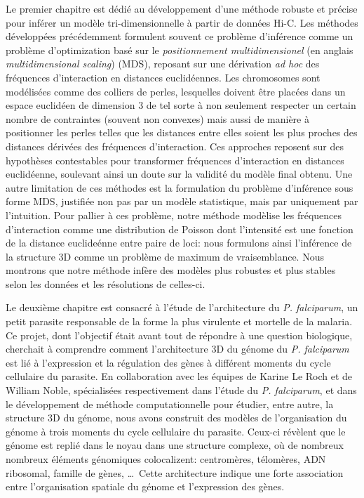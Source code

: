 \begin{resumes}
Le premier chapitre est dédié au développement d'une méthode robuste et
précise pour inférer un modèle tri-dimensionnelle à partir de données Hi-C.
Les méthodes développées précédemment formulent souvent ce problème
d'inférence comme un problème d'optimization basé sur le {\em positionnement
multidimensionel} (en anglais {\em multidimensional scaling}) (MDS), reposant
sur une dérivation {\em ad hoc} des fréquences d'interaction en distances
euclidéennes. Les chromosomes sont modélisées comme des colliers de perles,
lesquelles doivent être placées dans un espace euclidéen de dimension 3 de tel
sorte à non seulement respecter un certain nombre de contraintes (souvent non
convexes) mais aussi de manière à positionner les perles telles que les
distances entre elles soient les plus proches des distances dérivées des
fréquences d'interaction. Ces approches reposent sur des hypothèses
contestables
pour transformer fréquences d'interaction en distances euclidéenne, soulevant
ainsi un doute sur la validité du modèle final obtenu. Une autre limitation de
ces méthodes est la formulation du problème d'inférence sous forme MDS,
justifiée non pas par un modèle statistique, mais par uniquement par
l'intuition. Pour pallier à ces problème, notre méthode modèlise les
fréquences d'interaction comme une distribution de Poisson dont l'intensité
est une fonction de la distance euclideénne entre paire de loci: nous
formulons ainsi l'inférence de la structure 3D comme un problème de maximum de
vraisemblance. Nous montrons que notre méthode infère des modèles plus
robustes et plus stables selon les données et les résolutions de celles-ci.

Le deuxième chapitre est consacré à l'étude de l'architecture du {\em P.
falciparum}, un petit parasite responsable de la forme la plus virulente et
mortelle de la malaria. Ce projet, dont l'objectif était avant tout de répondre à une
question biologique, cherchait à comprendre comment l'architecture 3D du
génome du {\em P. falciparum} est lié à l'expression et la régulation des
gènes à différent moments du cycle cellulaire du parasite. En collaboration
avec les équipes de Karine Le Roch et de William Noble, spécialisées
respectivement dans l'étude du {\em P. falciparum}, et dans le développement
de méthode computationnelle pour étudier, entre autre, la structure 3D du
génome, nous avons construit des modèles de l'organisation du génome à trois
moments du cycle cellulaire du parasite. Ceux-ci révèlent que le génome est
replié dans le noyau dans une structure complexe, où de nombreux 
nombreux éléments génomiques colocalizent: centromères, télomères, ADN
ribosomal, famille
de gènes, \dots \ Cette architecture indique une forte association entre
l'organisation spatiale du génome et l'expression des gènes.


\end{resumes}
